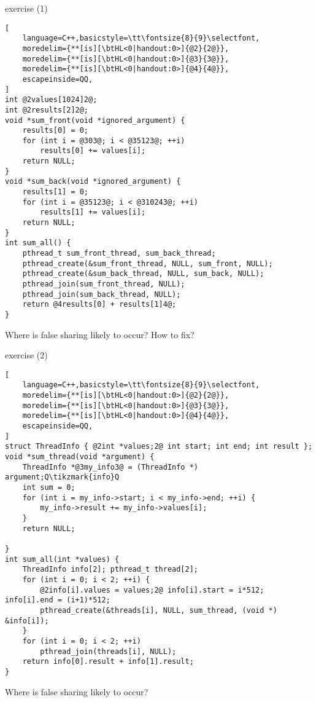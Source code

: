 \begin{frame}[fragile,label=falseSharingEx1]{exercise (1)}
\begin{lstlisting}[
    language=C++,basicstyle=\tt\fontsize{8}{9}\selectfont,
    moredelim={**[is][\btHL<0|handout:0>]{@2}{2@}},
    moredelim={**[is][\btHL<0|handout:0>]{@3}{3@}},
    moredelim={**[is][\btHL<0|handout:0>]{@4}{4@}},
    escapeinside=QQ,
]
int @2values[1024]2@;
int @2results[2]2@;
void *sum_front(void *ignored_argument) {
    results[0] = 0;
    for (int i = @303@; i < @35123@; ++i)
        results[0] += values[i];
    return NULL;
}
void *sum_back(void *ignored_argument) {
    results[1] = 0;
    for (int i = @35123@; i < @310243@; ++i)
        results[1] += values[i];
    return NULL;
}
int sum_all() {
    pthread_t sum_front_thread, sum_back_thread;
    pthread_create(&sum_front_thread, NULL, sum_front, NULL);
    pthread_create(&sum_back_thread, NULL, sum_back, NULL);
    pthread_join(sum_front_thread, NULL);
    pthread_join(sum_back_thread, NULL);
    return @4results[0] + results[1]4@;
}
\end{lstlisting}
Where is false sharing likely to occur? How to fix?
\end{frame}

\begin{frame}[fragile,label=falseSharingEx2]{exercise (2)}
\begin{lstlisting}[
    language=C++,basicstyle=\tt\fontsize{8}{9}\selectfont,
    moredelim={**[is][\btHL<0|handout:0>]{@2}{2@}},
    moredelim={**[is][\btHL<0|handout:0>]{@3}{3@}},
    moredelim={**[is][\btHL<0|handout:0>]{@4}{4@}},
    escapeinside=QQ,
]
struct ThreadInfo { @2int *values;2@ int start; int end; int result };
void *sum_thread(void *argument) {
    ThreadInfo *@3my_info3@ = (ThreadInfo *) argument;Q\tikzmark{info}Q
    int sum = 0;
    for (int i = my_info->start; i < my_info->end; ++i) {
        my_info->result += my_info->values[i];
    }
    return NULL;

}
int sum_all(int *values) {
    ThreadInfo info[2]; pthread_t thread[2];
    for (int i = 0; i < 2; ++i) {
        @2info[i].values = values;2@ info[i].start = i*512; info[i].end = (i+1)*512;
        pthread_create(&threads[i], NULL, sum_thread, (void *) &info[i]);
    }
    for (int i = 0; i < 2; ++i)
        pthread_join(threads[i], NULL);
    return info[0].result + info[1].result;
}
\end{lstlisting}
Where is false sharing likely to occur?
\end{frame}
